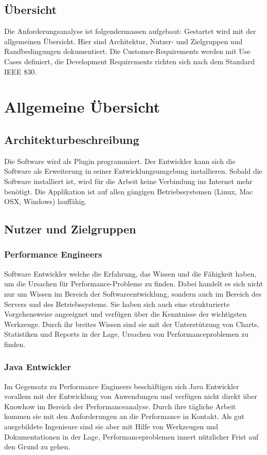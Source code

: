 \subsection{Übersicht}
Die Anforderungsanalyse ist folgendermassen aufgebaut: Gestartet wird mit der allgemeinen Übersicht. Hier sind Architektur, Nutzer- und Zielgruppen und Randbedingungen dokumentiert. Die Customer-Requirements werden mit Use Cases definiert, die Development Requirements richten sich nach dem Standard IEEE 830.

\section{Allgemeine Übersicht}\label{allgemeine_uebersicht}
\subsection{Architekturbeschreibung}
Die Software wird als Plugin programmiert. Der Entwickler kann sich die Software als Erweiterung in seiner Entwicklungsumgebung installieren. Sobald die Software installiert ist, wird für die Arbeit keine Verbindung ins Internet mehr benötigt. Die Applikation ist auf allen gängigen Betriebssystemen (Linux, Mac OSX, Windows) lauffähig.

\subsection{Nutzer und Zielgruppen}
\subsubsection{Performance Engineers}
Software Entwickler welche die Erfahrung, das Wissen und die Fähigkeit haben, um die Ursachen für Performance-Probleme zu finden. Dabei handelt es sich nicht nur um Wissen im Bereich der Softwareentwicklung, sondern auch im Bereich des Servers und des Betriebssystems. Sie haben sich auch eine strukturierte Vorgehensweise angeeignet und verfügen über die Kenntnisse der wichtigsten Werkzeuge. Durch ihr breites Wissen sind sie mit der Unterstützung von Charts, Statistiken und Reports in der Lage, Ursachen von Performanceproblemen zu finden.

\subsubsection{Java Entwickler}
Im Gegensatz zu Performance Engineers beschäftigen sich Java Entwickler vorallem mit der Entwicklung von Anwendungen und verfügen nicht direkt über Knowhow im Bereich der Performanceanalyse. Durch ihre tägliche Arbeit kommen sie mit den Anforderungen an die Performance in Kontakt. Als gut ausgebildete Ingenieure sind sie aber mit Hilfe von Werkzeugen und Dokumentationen in der Lage, Performanceproblemen innert nützlicher Frist auf den Grund zu gehen.

